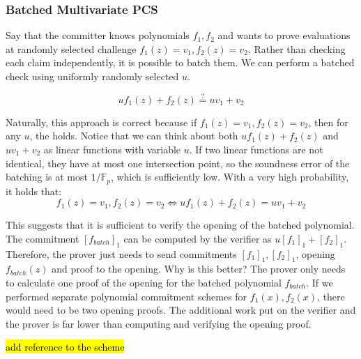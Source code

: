 \subsubsection{Batched Multivariate PCS}
Say that the committer knows polynomials $f_1, f_2$ and wants to prove evaluations at randomly selected challenge $f_1(z) = v_1, f_2(z) = v_2$. Rather than checking each claim independently, it is possible to batch them. We can perform a batched check using uniformly randomly selected $u$. 

\begin{equation}
    \label{batch-kzg}
    u f_1(z) + f_2(z) \stackrel{?}{=} u v_1 + v_2
\end{equation}

Naturally, this approach is correct because if $f_1(z) = v_1, f_2(z) = v_2$, then for any $u$, the  holds. Notice that we can think about both $u f_1(z) + f_2(z)$ and $u v_1 + v_2$ as linear functions with variable $u$. If two linear functions are not identical, they have at most one intersection point, so the soundness error of the batching is at most $1 / \mathbb{F}_p$, which is sufficiently low. With a very high probability, it holds that: $$f_1(z) = v_1, f_2(z) = v_2 \iff u f_1(z) + f_2(z) =u v_1 + v_2$$

This suggests that it is sufficient to verify the opening of the batched polynomial. The commitment $[f_{batch}]_1$ can be computed by the verifier as $u[f_1]_1 + [f_2]_1$. Therefore, the prover just needs to send commitments $[f_1]_1, [f_2]_1$, opening $f_{batch}(z)$ and proof to the opening. Why is this better? The prover only needs to calculate one proof of the opening for the batched polynomial $f_{batch}$. If we performed separate polynomial commitment schemes for $f_1(x), f_2(x)$, there would need to be two opening proofs. The additional work put on the verifier and the prover is far lower than computing and verifying the opening proof. 

\hl{add reference to the scheme}


